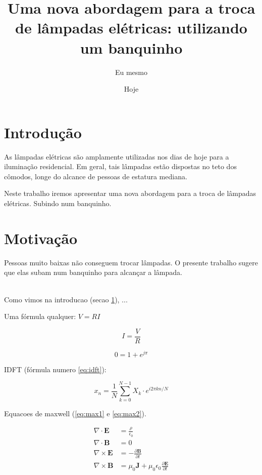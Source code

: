 \documentclass{article}
\author{Eu mesmo}
\date{Hoje}
\title{Uma nova abordagem para a troca de
       lâmpadas elétricas: utilizando um banquinho}
\newcommand{\vetor}[1]{\textbf{#1}}
\begin{document}
\maketitle

\newpage

\section{Introdução}
\label{sec:intro}

As lâmpadas elétricas são amplamente utilizadas nos dias
de hoje para a iluminação residencial.
Em geral, tais lâmpadas estão dispostas no teto dos cômodos,
longe do alcance de pessoas de estatura mediana.


Neste trabalho  iremos apresentar uma nova abordagem
para a troca  de lâmpadas elétricas.
Subindo  num  banquinho. %


\section{Motivação}
\label{sec:motiv}

Pessoas muito baixas não conseguem trocar lâmpadas.
O presente trabalho sugere que elas subam num
banquinho para alcançar a lâmpada.

\hfill \\

Como vimos na introducao (secao \ref{sec:intro}),
...

Uma fórmula qualquer: $V=R I$

$$I = \frac{V}{R}$$

$$0=1+e^{j\pi}$$

IDFT (fórmula numero \ref{eq:idft}):

\begin{equation}
\label{eq:idft}
x_n = \frac{1}{N}
\sum_{k=0}^{N-1} X_k \cdot
e^{i2\pi kn/N}
\end{equation}

Equacoes de maxwell (\ref{eq:max1} e \ref{eq:max2}).

\begin{align}
\label{eq:max1}
\nabla \cdot \vetor{E} & = \frac{\rho}{\epsilon_0} \\
\label{eq:max2}
\nabla \cdot \vetor{B} & = 0 \\
\nabla \times \vetor{E}
& = - \frac{\partial \vetor{B}}{\partial t} \\
\nabla \times \vetor{B} & =
\mu_0\vetor{J} + \mu_0 \epsilon_0
\frac{\partial \vetor{E}}{\partial t}
\end{align}
\end{document}
